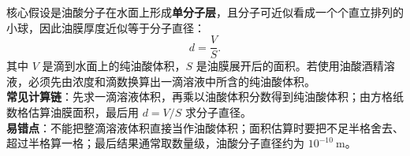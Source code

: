 \begin{casetypebox}[title={\strut\textcolor{white}{\bfseries 常见题型：油膜法估测分子直径}}]
核心假设是油酸分子在水面上形成\textbf{单分子层}，且分子可近似看成一个个直立排列的小球，因此油膜厚度近似等于分子直径：
\[
  d=\frac{V}{S}.
\]
其中 $V$ 是滴到水面上的纯油酸体积，$S$ 是油膜展开后的面积。若使用油酸酒精溶液，必须先由浓度和滴数换算出一滴溶液中所含的纯油酸体积。\\

\textbf{常见计算链}：先求一滴溶液体积，再乘以油酸体积分数得到纯油酸体积；由方格纸数格估算油膜面积，最后用 $d=V/S$ 求分子直径。\\

\textbf{易错点}：不能把整滴溶液体积直接当作油酸体积；面积估算时要把不足半格舍去、超过半格算一格；最后结果通常取数量级，油酸分子直径约为 $10^{-10}\ \mathrm{m}$。
\end{casetypebox}

